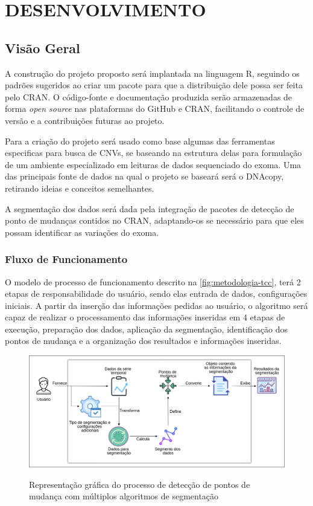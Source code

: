 \section{DESENVOLVIMENTO}

\subsection{Visão Geral}

A construção do projeto proposto será implantada na linguagem R, seguindo os padrões sugeridos ao criar um pacote para que a distribuição dele possa ser feita pelo CRAN. O código-fonte e documentação produzida serão armazenadas de forma \textit{open source} nas plataformas do GitHub e CRAN, facilitando o controle de versão e a contribuições futuras ao projeto.

Para a criação do projeto será usado como base algumas das ferramentas especificas para busca de CNVs, se baseando na estrutura delas para formulação de um ambiente especializado em leituras de dados sequenciado do exoma. Uma das principais fonte de dados na qual o projeto se baseará será o DNAcopy, retirando ideias e conceitos semelhantes.

A segmentação dos dados será dada pela integração de pacotes de detecção de ponto de mudanças contidos no CRAN, adaptando-os se necessário para que eles possam identificar as variações do exoma.

\subsubsection{Fluxo de Funcionamento}

O modelo de processo de funcionamento descrito na \autoref{fig:metodologia-tcc}, terá 2 etapas de responsabilidade do usuário, sendo elas entrada de dados, configurações iniciais. A partir da inserção das informações pedidas ao usuário, o algoritmo será capaz de realizar o processamento das informações inseridas em 4 etapas de execução, preparação dos dados, aplicação da segmentação, identificação dos pontos de mudança e a organização dos resultados e informações inseridas.

\begin{figure}[!htb]
    \centering
    \caption{Representação gráfica do processo de detecção de pontos de mudança com múltiplos algoritmos de segmentação}
    \includegraphics[width=1\textwidth]{./dados/figuras/metodologia-tcc}
    \label{fig:metodologia-tcc}
\end{figure}

